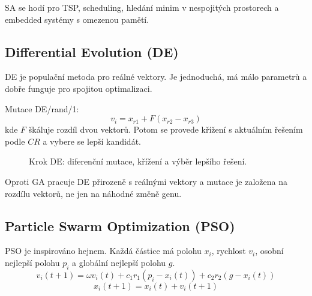 SA se hodí pro TSP, scheduling, hledání minim v nespojitých prostorech a
embedded systémy s omezenou pamětí.

\subsection*{Differential Evolution (DE)}
DE je populační metoda pro reálné vektory. Je jednoduchá, má málo parametrů a
dobře funguje pro spojitou optimalizaci.

Mutace DE/rand/1:
\begin{equation}
    v_i = x_{r1} + F(x_{r2}-x_{r3})
\end{equation}
kde \(F\) škáluje rozdíl dvou vektorů. Potom se provede křížení s aktuálním
řešením podle \(CR\) a vybere se lepší kandidát.

\begin{figure}[H]
    \centering
    \caption{Krok DE: diferenční mutace, křížení a výběr lepšího řešení.}
\end{figure}

Oproti GA pracuje DE přirozeně s reálnými vektory a mutace je založena na
rozdílu vektorů, ne jen na náhodné změně genu.

\subsection*{Particle Swarm Optimization (PSO)}
PSO je inspirováno hejnem. Každá částice má polohu \(x_i\), rychlost \(v_i\),
osobní nejlepší polohu \(p_i\) a globální nejlepší polohu \(g\).
\begin{equation}
    v_i(t+1)=\omega v_i(t)+c_1 r_1(p_i-x_i(t))+c_2 r_2(g-x_i(t))
\end{equation}
\begin{equation}
    x_i(t+1)=x_i(t)+v_i(t+1)
\end{equation}

